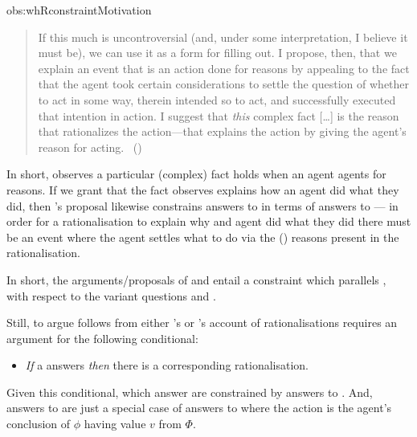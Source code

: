 \begin{note}
\begin{motivation}{obs:whRconstraintMotivation}
\begin{quote}
      If this much is uncontroversial (and, under some interpretation, I believe it must be), we can use it as a form for filling out.
      I propose, then, that we explain an event that is an action done for reasons by appealing to the fact that the agent took certain considerations to settle the question of whether to act in some way, therein intended so to act, and successfully executed that intention in action.
      I suggest that \emph{this} complex fact [\dots] is the reason that rationalizes the action---that explains the action by giving the agent's reason for acting.%
      \mbox{ }\hfill\mbox{(\citeyear[421]{Hieronymi:2011aa})}
    \end{quote}
    In short, \citeauthor{Hieronymi:2011aa} observes a particular (complex) fact holds when an agent agents for reasons.
    If we grant that the fact \citeauthor{Hieronymi:2011aa} observes explains how an agent did what they did, then \citeauthor{Hieronymi:2011aa}'s proposal likewise constrains answers to \qWhyR{} in terms of answers to \qHowR{} --- in order for a rationalisation to explain why and agent did what they did there must be an event where the agent settles what to do via the (\agents{}) reasons present in the rationalisation.
  \end{motivation}

  \noindent%
  In short, the arguments/proposals of \citeauthor{Davidson:1963aa} and \citeauthor{Hieronymi:2011aa} entail a constraint which parallels \issueInclusion{}, with respect to the variant questions \qWhyR{} and \qHowR{}.

  Still, to argue \issueInclusion{} follows from either \citeauthor{Davidson:1963aa}'s or \citeauthor{Hieronymi:2011aa}'s account of rationalisations requires an argument for the following conditional:
  \begin{itemize}
  \item
    \emph{If} a \fingfr{} answers \qWhy{} \emph{then} there is a corresponding rationalisation.
  \end{itemize}
  Given this conditional,  which answer \qWhy{} are constrained by answers to \qHowR{}.
  And, answers to \qHow{} are just a special case of answers to \qHowR{} where the action is the agent's conclusion of \(\phi\) having value \(v\) from \(\Phi\).
\end{note}

